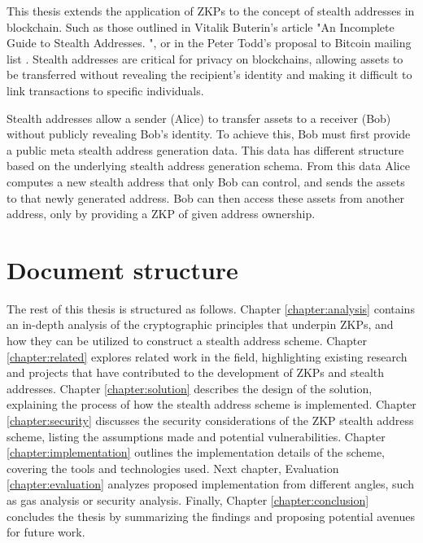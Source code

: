 This thesis extends the application of ZKPs to the concept of stealth
addresses in blockchain. Such as those outlined in Vitalik Buterin's article "An
Incomplete Guide to Stealth Addresses. "\cite{ButerinIncompleteGuide}, or
in the Peter Todd's proposal to Bitcoin mailing list \cite{ToddStealthAddresses}.
Stealth addresses are critical for privacy on blockchains, allowing assets to
be transferred without revealing the recipient's identity and making
it difficult to link transactions to specific individuals.

Stealth addresses allow a sender (Alice) to transfer assets to a receiver (Bob) without
publicly revealing Bob's identity. To achieve this, Bob
must first provide a public meta stealth address generation data. This data
has different structure based on the underlying stealth address generation
schema. From this data Alice computes a new stealth address that only Bob can
control, and sends the assets to that newly generated address. Bob can then
access these assets from another address, only by providing a ZKP of given
address ownership.

\section{Document structure}

The rest of this thesis is structured as follows. Chapter \ref{chapter:analysis}
contains an in-depth analysis of the cryptographic principles that underpin ZKPs,
and how they can be utilized to construct a stealth address scheme.
 Chapter \ref{chapter:related} explores related work in the field, highlighting
existing research and projects that have contributed to the development of ZKPs and
stealth addresses. Chapter \ref{chapter:solution} describes the design of the
solution, explaining the process of how the stealth address scheme is
implemented. Chapter \ref{chapter:security} discusses the security
considerations of the ZKP stealth address scheme, listing the assumptions made
and potential vulnerabilities. Chapter \ref{chapter:implementation} outlines
the implementation details of the scheme, covering the tools and technologies
used. Next chapter, Evaluation \ref{chapter:evaluation} analyzes proposed
implementation from different angles, such as gas analysis or security analysis.
Finally, Chapter \ref{chapter:conclusion} concludes the thesis by
summarizing the findings and proposing potential avenues for future work.

